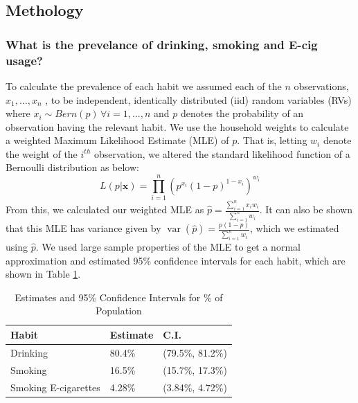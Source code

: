 \documentclass[
  11pt,
  twocolumn]{article}
\begin{document}
\hypertarget{methology}{%
\subsection{Methology}\label{methology}}

\hypertarget{what-is-the-prevelance-of-drinking-smoking-and-e-cig-usage}{%
\subsubsection{What is the prevelance of drinking, smoking and E-cig
usage?}\label{what-is-the-prevelance-of-drinking-smoking-and-e-cig-usage}}

To calculate the prevalence of each habit we assumed each of the \(n\)
observations, \(x_1,…,x_n\) , to be independent, identically distributed
(iid) random variables (RVs) where
\(x_i \sim Bern(p)\, \forall i=1,…,n\) and \(p\) denotes the probability
of an observation having the relevant habit. We use the household
weights to calculate a weighted Maximum Likelihood Estimate (MLE) of
\(p\). That is, letting \(w_i\) denote the weight of the \(i^{th}\)
observation, we altered the standard likelihood function of a Bernoulli
distribution as below:
\[L(p|\textbf{x}) = \prod_{i = 1}^{n} (p^{x_i}(1-p)^{1-x_i})^{w_i}\]
From this, we calculated our weighted MLE as
\(\widehat{p} = \frac{\sum_{i=1}^{n} x_iw_i}{\sum_{i=1}^{n} w_i}\). It
can also be shown that this MLE has variance given by
\(\mathop{\mathrm{var}}(\widehat{p})=\frac{p(1-p)}{\sum_{i=1}^{n}w_i}\),
which we estimated using \(\widehat{p}\). We used large sample
properties of the MLE to get a normal approximation and estimated 95\%
confidence intervals for each habit, which are shown in Table
\ref{tab:output-estimates-table}.

\begin{table}

\caption{\label{tab:outputestimatestable}Estimates and 95\% Confidence Intervals for \% of Population\label{tab:output-estimates-table}}
\centering
\begin{tabular}[t]{l|l|l}
\hline
\textbf{Habit} & \textbf{Estimate} & \textbf{C.I.}\\
\hline
Drinking & 80.4\% & (79.5\%, 81.2\%)\\
\hline
Smoking & 16.5\% & (15.7\%, 17.3\%)\\
\hline
Smoking E-cigarettes & 4.28\% & (3.84\%, 4.72\%)\\
\hline
\end{tabular}
\end{table}
\end{document}
